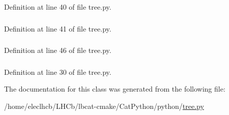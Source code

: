 Definition at line 40 of file tree.py.\hypertarget{classtree_1_1TreeCtrlPanel_aef4dd2f2fa6f44f114b8d26fab6003af}{
\subsubsection[{fldropenidx}]{}}
\label{classtree_1_1TreeCtrlPanel_aef4dd2f2fa6f44f114b8d26fab6003af}


Definition at line 41 of file tree.py.\hypertarget{classtree_1_1TreeCtrlPanel_a25c91bdac8149c9767062a4fb0c0d563}{
\subsubsection[{il}]{}}
\label{classtree_1_1TreeCtrlPanel_a25c91bdac8149c9767062a4fb0c0d563}


Definition at line 46 of file tree.py.\hypertarget{classtree_1_1TreeCtrlPanel_ac9e9de14a996c897c125b174776f2fde}{
\subsubsection[{tree}]{}}
\label{classtree_1_1TreeCtrlPanel_ac9e9de14a996c897c125b174776f2fde}


Definition at line 30 of file tree.py.

The documentation for this class was generated from the following file:\begin{DoxyCompactItemize}
\item 
/home/eleclhcb/LHCb/lbcat-\/cmake/CatPython/python/\hyperlink{tree_8py}{tree.py}\end{DoxyCompactItemize}
